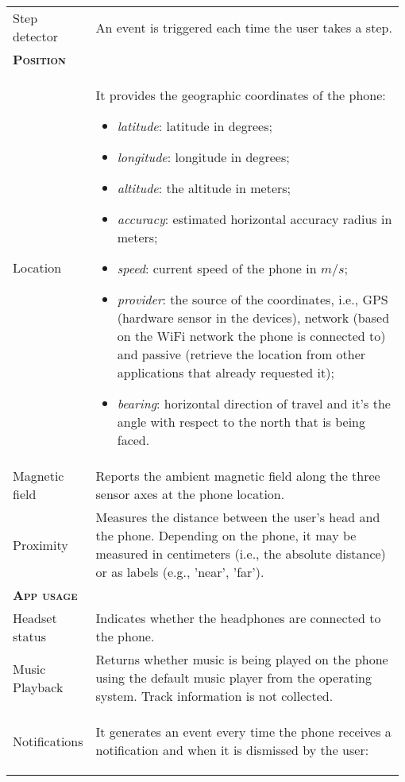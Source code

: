 \begin{center}
\begin{longtable}{p{0.15\linewidth}|p{0.83\linewidth}}
    Step detector & 
    An event is triggered each time the user takes a step. \\
    \multicolumn{2}{l}{\textbf{\textsc{Position}}} \\
    Location & It provides the geographic coordinates of the phone:
    \begin{itemize}
        \item \textit{latitude}: latitude in degrees;
        \item \textit{longitude}: longitude in degrees;
        \item \textit{altitude}: the altitude in meters;
        \item \textit{accuracy}: estimated horizontal accuracy radius in meters;
        \item \textit{speed}: current speed of the phone in $m/s$;
        \item \textit{provider}: the source of the coordinates, i.e., GPS (hardware sensor in the devices), network (based on the WiFi network  the phone is connected to) and passive (retrieve the location from other applications that already requested it);
        \item \textit{bearing}: horizontal direction of travel and it's the angle with respect to the north that is being faced.
    \end{itemize} \\
    Magnetic field &
    Reports the ambient magnetic field along the three sensor axes at the phone location. \\
    Proximity & Measures the distance between the user's head and the phone. Depending on the phone, it may be measured in centimeters (i.e., the absolute distance) or as labels (e.g., 'near', 'far'). \\
    \multicolumn{2}{l}{\textbf{\textsc{App usage}}} \\
    Headset status & Indicates whether the headphones are connected to the phone. \\
    Music Playback & Returns whether music is being played on the phone using the default music player from the operating system. Track information is not collected.\\
    Notifications & It generates an event every time the phone receives a notification and when it is dismissed by the user:
    \begin{itemize}

\end{itemize}
\end{longtable}
\end{center}
